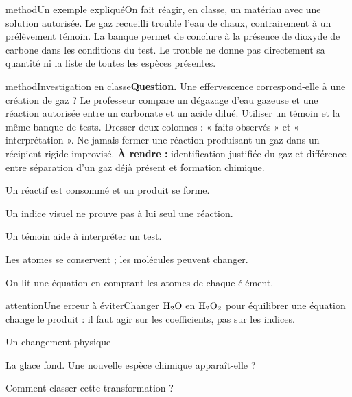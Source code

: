 \begin{pcEncadre}{method}{Un exemple expliqué}On fait réagir, en classe, un matériau avec une solution autorisée. Le gaz recueilli trouble l’eau de chaux, contrairement à un prélèvement témoin. La banque permet de conclure à la présence de dioxyde de carbone dans les conditions du test. Le trouble ne donne pas directement sa quantité ni la liste de toutes les espèces présentes.\end{pcEncadre}
\label{activite-6}
\begin{pcEncadre}{method}{Investigation en classe}\textbf{Question.} Une effervescence correspond-elle à une création de gaz ? Le professeur compare un dégazage d’eau gazeuse et une réaction autorisée entre un carbonate et un acide dilué. Utiliser un témoin et la même banque de tests. Dresser deux colonnes : « faits observés » et « interprétation ». Ne jamais fermer une réaction produisant un gaz dans un récipient rigide improvisé. \textbf{À rendre :} identification justifiée du gaz et différence entre séparation d’un gaz déjà présent et formation chimique.\end{pcEncadre}
\begin{questions}
\item Un réactif est consommé et un produit se forme.
\item Un indice visuel ne prouve pas à lui seul une réaction.
\item Un témoin aide à interpréter un test.
\item Les atomes se conservent ; les molécules peuvent changer.
\item On lit une équation en comptant les atomes de chaque élément.
\end{questions}
\begin{pcEncadre}{attention}{Une erreur à éviter}Changer $\ce{H2O}$ en $\ce{H2O2}$ pour équilibrer une équation change le produit : il faut agir sur les coefficients, pas sur les indices.\end{pcEncadre}
\pcGrille
\clearpage{}
\par\noindent\begin{minipage}{\linewidth}
\begin{exercice}[1]{Un changement physique}
\begin{questions}
\item La glace fond. Une nouvelle espèce chimique apparaît-elle ?
\item Comment classer cette transformation ?
\end{questions}
\end{exercice}
\end{minipage}
